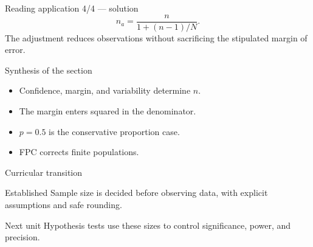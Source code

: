 \documentclass[10pt,aspectratio=169]{beamer}
\begin{document}
\begin{frame}{Reading application 4/4 --- solution}
  \footnotesize
  \[
    n_a=\frac{n}{1+(n-1)/N}.
  \]
  The adjustment reduces observations without sacrificing the stipulated margin
  of error.
\end{frame}

\begin{frame}{Synthesis of the section}
  \footnotesize
  \begin{itemize}\itemsep=0.12cm
    \item Confidence, margin, and variability determine $n$.
    \item The margin enters squared in the denominator.
    \item $p=0.5$ is the conservative proportion case.
    \item FPC corrects finite populations.
  \end{itemize}
\end{frame}

\begin{frame}{Curricular transition}
  \footnotesize
  \begin{block}{Established}
    Sample size is decided before observing data, with explicit assumptions and
    safe rounding.
  \end{block}
  \begin{alertblock}{Next unit}
    Hypothesis tests use these sizes to control significance, power, and
    precision.
  \end{alertblock}
\end{frame}
\end{document}
